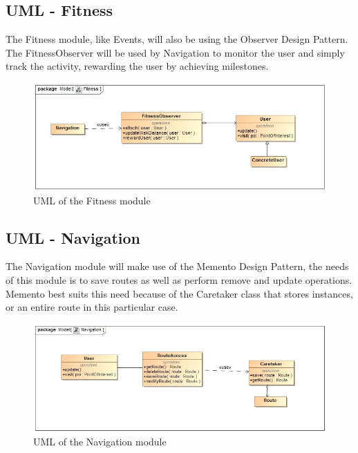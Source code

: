 \documentclass[12pt,a4paper]{article}
\begin{document}
	\subsection{UML - Fitness}
	The Fitness module, like Events, will also be using the Observer Design Pattern. The FitnessObserver will be used by Navigation to monitor the user and simply track the activity, rewarding the user by achieving milestones.
	\begin{figure}
		\includegraphics[width=\linewidth]{Images/Fitness.jpg}
		\caption{UML of the Fitness module}
	\end{figure}
	
	\subsection{UML - Navigation}
	The Navigation module will make use of the Memento Design Pattern, the needs of this module is to save routes as well as perform remove and update operations. Memento best suits this need because of the Caretaker class that stores instances, or an entire route in this particular case.
	\begin{figure}
		\includegraphics[width=\linewidth]{Images/Navigation.jpg}
		\caption{UML of the Navigation module}
	\end{figure}
	
\end{document}
